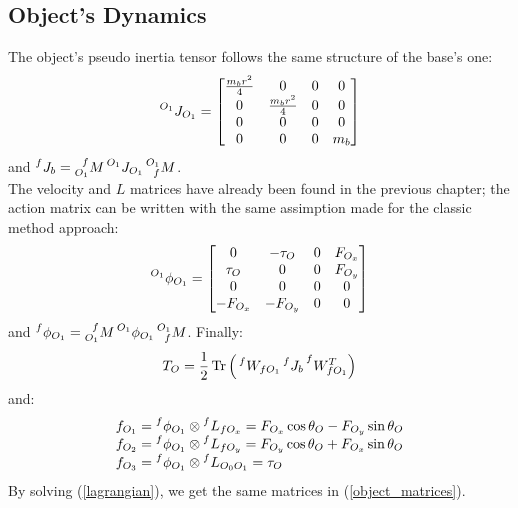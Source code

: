 \documentclass[a4paper,12pt,oneside]{report}
\DeclareMathOperator{\Tr}{Tr}
\begin{document}
\subsection{Object's Dynamics}
The object's pseudo inertia tensor follows the same structure of the base's one:
\begin{equation}
  \prescript{O_1}{}{J_{O_1}}=\begin{bmatrix}
    \frac{m_br^2}{4}&0&0&0\\
    0&\frac{m_br^2}{4}&0&0\\
    0&0&0&0\\
    0&0&0&m_b
  \end{bmatrix}
\end{equation}
and $\prescript{f}{}{J_b}=\prescript{f}{O_1}{M}\prescript{O_1}{}{J_{O_1}}\prescript{O_1}{f}{M}$.\\
The velocity and $L$ matrices have already been found in the previous chapter; the action matrix can be written with the same assimption made for the classic method approach:
\begin{equation}
  \prescript{O_1}{}{\phi_{O_1}}=\begin{bmatrix}
    0&-\tau_O&0&F_{O_x}\\
    \tau_O&0&0&F_{O_y}\\
    0&0&0&0\\
    -F_{O_x}&-F_{O_y}&0&0
  \end{bmatrix}
\end{equation}
and $\prescript{f}{}{\phi_{O_1}}=\prescript{f}{O_1}{M}\prescript{O_1}{}{\phi_{O_1}}\prescript{O_1}{f}{M}$.
Finally:
\begin{equation}
  T_O=\frac{1}{2}\Tr{\Big(\prescript{f}{}{W_{fO_1}}\prescript{f}{}{J_b}\prescript{f}{}{W_{fO_1}^T}\Big)}
\end{equation}
and:
\begin{equation}
  \begin{array}{l}
    f_{O_1}=\prescript{f}{}{\phi_{O_1}}\otimes \prescript{f}{}{L_{fO_x}}=F_{O_x}\cos{\theta_O}-F_{O_y}\sin{\theta_O}\\
    f_{O_2}=\prescript{f}{}{\phi_{O_1}}\otimes \prescript{f}{}{L_{fO_y}}=F_{O_y}\cos{\theta_O}+F_{O_x}\sin{\theta_O}\\
    f_{O_3}=\prescript{f}{}{\phi_{O_1}}\otimes \prescript{f}{}{L_{O_0O_1}}=\tau_O
  \end{array}
\end{equation}
By solving (\ref{lagrangian}), we get the same matrices in (\ref{object_matrices}).
\newpage
\end{document}
